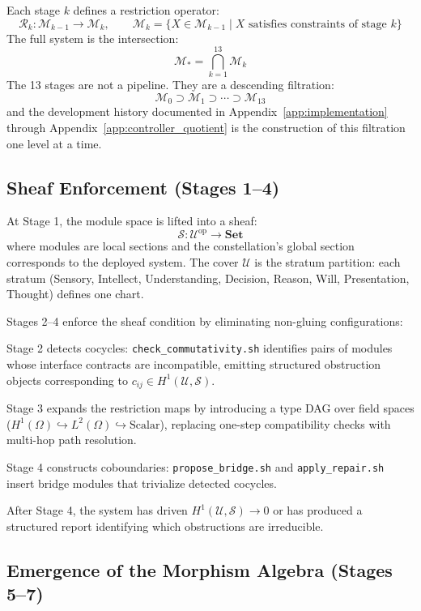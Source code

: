\documentclass[11pt, oneside]{article}
\begin{document}
Each stage $k$ defines a restriction operator:
\[
\mathcal{R}_k : \mathcal{M}_{k-1} \to \mathcal{M}_k, \qquad
\mathcal{M}_k = \{ X \in \mathcal{M}_{k-1} \mid X \text{ satisfies constraints of stage } k \}
\]
The full system is the intersection:
\[
\mathcal{M}_* = \bigcap_{k=1}^{13} \mathcal{M}_k
\]
The 13 stages are not a pipeline. They are a descending filtration:
\[
\mathcal{M}_0 \supset \mathcal{M}_1 \supset \cdots \supset \mathcal{M}_{13}
\]
and the development history documented in Appendix~\ref{app:implementation} through
Appendix~\ref{app:controller_quotient} is the construction of this filtration one level
at a time.

\subsection{Sheaf Enforcement (Stages 1--4)}

At Stage 1, the module space is lifted into a sheaf:
\[
\mathcal{S} : \mathcal{U}^{\mathrm{op}} \to \mathbf{Set}
\]
where modules are local sections and the constellation's global section corresponds to
the deployed system. The cover $\mathcal{U}$ is the stratum partition: each stratum
(Sensory, Intellect, Understanding, Decision, Reason, Will, Presentation, Thought)
defines one chart.

Stages 2--4 enforce the sheaf condition by eliminating non-gluing configurations:

Stage 2 detects cocycles: \texttt{check\_commutativity.sh} identifies pairs of modules
whose interface contracts are incompatible, emitting structured obstruction objects
corresponding to $c_{ij} \in H^1(\mathcal{U}, \mathcal{S})$.

Stage 3 expands the restriction maps by introducing a type DAG over field spaces
($H^1(\Omega) \hookrightarrow L^2(\Omega) \hookrightarrow \mathrm{Scalar}$),
replacing one-step compatibility checks with multi-hop path resolution.

Stage 4 constructs coboundaries: \texttt{propose\_bridge.sh} and
\texttt{apply\_repair.sh} insert bridge modules that trivialize detected cocycles.

After Stage 4, the system has driven $H^1(\mathcal{U}, \mathcal{S}) \to 0$ or has
produced a structured report identifying which obstructions are irreducible.

\subsection{Emergence of the Morphism Algebra (Stages 5--7)}
\end{document}
